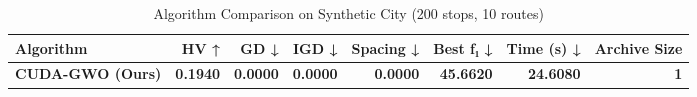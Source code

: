 \begin{table}[ht]
\centering
\caption{Algorithm Comparison on Synthetic City (200 stops, 10 routes)}
\label{tab:results}
\begin{tabular}{lrrrrrrr}
\toprule
Algorithm & HV ↑ & GD ↓ & IGD ↓ & Spacing ↓ & Best f₁ ↓ & Time (s) ↓ & Archive Size \\
\midrule
\textbf{\textbf{CUDA-GWO (Ours)}} & \textbf{0.1940} & \textbf{0.0000} & \textbf{0.0000} & \textbf{0.0000} & \textbf{45.6620} & \textbf{24.6080} & \textbf{1} \\
\bottomrule
\end{tabular}
\end{table}